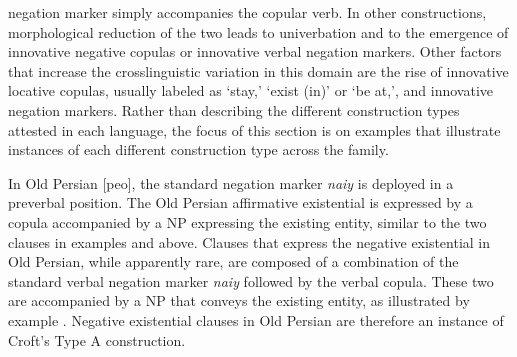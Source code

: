﻿\documentclass[output=paper]{langsci/langscibook}
\begin{document}
negation marker simply accompanies the copular verb. In other
constructions, morphological reduction of the two leads to univerbation and
to the emergence of innovative negative copulas or innovative verbal
negation markers. Other factors that increase the crosslinguistic variation
in this domain are the rise of innovative locative copulas, usually labeled
as `stay,' `exist (in)' or `be at,', and innovative negation markers.
Rather than describing the different construction types attested in each
language, the focus of this section is on examples that illustrate
instances of each different construction type across the family.

In Old Persian [peo], the standard negation marker \textit{naiy} is
deployed in a preverbal position. The Old Persian affirmative existential
is expressed by a copula accompanied by a NP expressing the existing
entity, similar to the two clauses in examples 
and  above. Clauses that express the
negative existential in
Old Persian, while apparently rare, are composed of a combination of the
standard verbal negation marker \textit{naiy} followed by the verbal
copula. These two are accompanied by a NP that conveys the existing entity,
as illustrated by example . Negative
existential clauses in Old Persian are therefore an instance of Croft's
Type A construction.
%
\begin{exe}
\end{exe}
\end{document}
